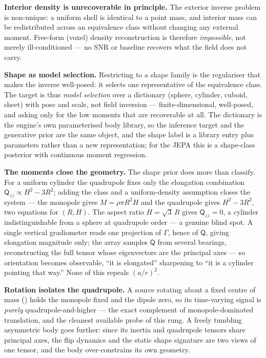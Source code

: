 \documentclass[11pt,a4paper]{article}
\theoremstyle{reqstyle}
\begin{document}
\textbf{Interior density is unrecoverable in principle.} The exterior inverse problem is
non-unique: a uniform shell is identical to a point mass, and interior mass can be
redistributed across an equivalence class without changing any external moment. Free-form
(voxel) density reconstruction is therefore \emph{impossible}, not merely ill-conditioned ---
no SNR or baseline recovers what the field does not carry.

\textbf{Shape as model selection.} Restricting to a shape family is the regulariser that makes
the inverse well-posed: it selects one representative of the equivalence class. The target is
thus \emph{model selection} over a dictionary (sphere, cylinder, cuboid, sheet) with pose and
scale, not field inversion --- finite-dimensional, well-posed, and asking only for the low
moments that are recoverable at all. The dictionary is the engine's own parameterised body
library, so the inference target and the generative prior are the same object, and the shape
label is a library entry plus parameters rather than a new representation; for the JEPA this is
a shape-class posterior with continuous moment regression.

\textbf{The moments close the geometry.} The shape prior does more than classify. For a uniform
cylinder the quadrupole fixes only the elongation combination $\mathsf{Q}_{zz}\propto H^2-3R^2$;
adding the class and a uniform-density assumption closes the system --- the monopole gives
$M=\rho\pi R^2 H$ and the quadrupole gives $H^2-3R^2$, two equations for $(R,H)$. The aspect
ratio $H=\sqrt3\,R$ gives $\mathsf{Q}_{zz}=0$, a cylinder indistinguishable from a sphere at
quadrupole order --- a genuine blind spot. A single vertical gradiometer reads one projection of
$\Gamma$, hence of $\mathsf{Q}$, giving elongation magnitude only; the array samples
$\mathsf{Q}$ from several bearings, reconstructing the full tensor whose eigenvectors are the
principal axes --- so orientation becomes observable, ``it is elongated'' sharpening to ``it is
a cylinder pointing that way.'' None of this repeals $(a/r)^2$.

\textbf{Rotation isolates the quadrupole.} A source rotating about a fixed centre of mass
() holds the monopole fixed and the dipole zero, so its time-varying signal is
\emph{purely} quadrupole-and-higher --- the exact complement of monopole-dominated translation,
and the cleanest available probe of this rung. A freely tumbling asymmetric body goes further:
since its inertia and quadrupole tensors share principal axes, the flip dynamics and the static
shape signature are two views of one tensor, and the body over-constrains its own geometry.
\end{document}

